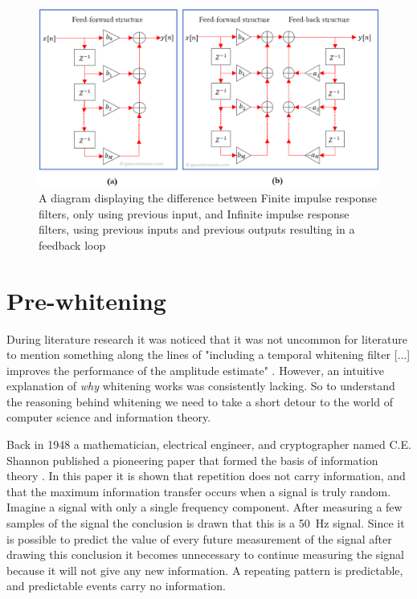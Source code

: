 \begin{figure}[h!t]
	\begin{center}
		\includegraphics[width=1.0\columnwidth]{images/fir_vs_iir_diagram.png}
	\end{center}
	\caption{A diagram displaying the difference between Finite impulse response filters, only using previous input, and Infinite impulse response filters, using previous inputs and previous outputs resulting in a feedback loop \cite{fir_vs_iir_diagram}}
	\label{fig:fir_vs_iir_diagram}
\end{figure}


\section{Pre-whitening}
During literature research it was noticed that it was not uncommon for literature to mention something along the lines of "including a temporal whitening filter [...] improves the performance of the amplitude estimate" \cite{single_site_emg_amplitude_estimation,adaptive_whitening,emg_whitening}. However, an intuitive explanation of \textit{why} whitening works was consistently lacking. So to understand the reasoning behind whitening we need to take a short detour to the world of computer science and information theory.

Back in 1948 a mathematician, electrical engineer, and cryptographer named C.E. Shannon published a pioneering paper that formed the basis of information theory \cite{shannon}. In this paper it is shown that repetition does not carry information, and that the maximum information transfer occurs when a signal is truly random. Imagine a signal with only a single frequency component. After measuring a few samples of the signal the conclusion is drawn that this is a \SI{50}{\hertz} signal. Since it is possible to predict the value of every future measurement of the signal after drawing this conclusion it becomes unnecessary to continue measuring the signal because it will not give any new information. A repeating pattern is predictable, and predictable events carry no information.


